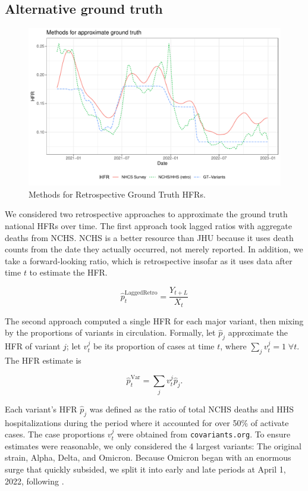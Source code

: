 \documentclass{article}
\begin{document}
\subsection{Alternative ground truth}\label{apx:alt_gt}

\begin{figure}
    \centering
    \includegraphics[width=0.8\linewidth]{Figs/Real/ApproxGT.pdf}
    \caption{Methods for Retrospective Ground Truth HFRs.}
    \label{fig:approxGT}
\end{figure}

We considered two retrospective approaches to approximate the ground truth national HFRs over time. The first approach took lagged ratios with aggregate deaths from NCHS. NCHS is a better resource than JHU because it uses death counts from the date they actually occurred, not merely reported. In addition, we take a forward-looking ratio, which is retrospective insofar as it uses data after time $t$ to estimate the HFR.

\begin{equation}\label{eq:LaggedRetro}
    \hat{p}_t^{\text{LaggedRetro}} = \frac{Y_{t+L}}{X_t}
\end{equation}

The second approach computed a single HFR for each major variant, then mixing by the proportions of variants in circulation. Formally, let $\hat{p}_j$ approximate the HFR of variant $j$; let $v_t^j$ be its proportion of cases at time $t$, where $\sum_j v_t^j = 1 \; \forall t$. The HFR estimate is

$$\hat{p}_t^{\text{Var}} = \sum_j v_t^j \hat{p}_j.$$

Each variant's HFR $\hat p_j$ was defined as the ratio of total NCHS deaths and HHS hospitalizations during the period where it accounted for over 50\% of activate cases. The case proportions $v_t^j$ were obtained from \texttt{covariants.org}. To ensure estimates were reasonable, we only considered the 4 largest variants: The original strain, Alpha, Delta, and Omicron. Because Omicron began with an enormous surge that quickly subsided, we split it into early and late periods at April 1, 2022, following \citep{adjei2022mortality}.
\end{document}
